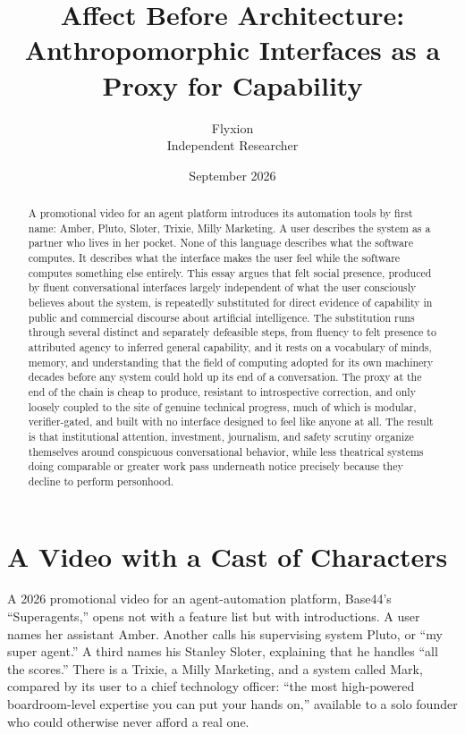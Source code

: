 \documentclass[11pt]{article}
\title{Affect Before Architecture: Anthropomorphic Interfaces as a Proxy for Capability}
\author{Flyxion \\ \small Independent Researcher}
\date{September 2026}
\begin{document}
\maketitle

\begin{abstract}
A promotional video for an agent platform introduces its automation tools by first name: Amber, Pluto, Sloter, Trixie, Milly Marketing. A user describes the system as a partner who lives in her pocket. None of this language describes what the software computes. It describes what the interface makes the user feel while the software computes something else entirely. This essay argues that felt social presence, produced by fluent conversational interfaces largely independent of what the user consciously believes about the system, is repeatedly substituted for direct evidence of capability in public and commercial discourse about artificial intelligence. The substitution runs through several distinct and separately defeasible steps, from fluency to felt presence to attributed agency to inferred general capability, and it rests on a vocabulary of minds, memory, and understanding that the field of computing adopted for its own machinery decades before any system could hold up its end of a conversation. The proxy at the end of the chain is cheap to produce, resistant to introspective correction, and only loosely coupled to the site of genuine technical progress, much of which is modular, verifier-gated, and built with no interface designed to feel like anyone at all. The result is that institutional attention, investment, journalism, and safety scrutiny organize themselves around conspicuous conversational behavior, while less theatrical systems doing comparable or greater work pass underneath notice precisely because they decline to perform personhood.
\end{abstract}

\section{A Video with a Cast of Characters}
\label{sec:video}

A 2026 promotional video for an agent-automation platform, Base44's ``Superagents,''\cite{base44} opens not with a feature list but with introductions. A user names her assistant Amber. Another calls his supervising system Pluto, or ``my super agent.'' A third names his Stanley Sloter, explaining that he handles ``all the scores.'' There is a Trixie, a Milly Marketing, and a system called Mark, compared by its user to a chief technology officer: ``the most high-powered boardroom-level expertise you can put your hands on,'' available to a solo founder who could otherwise never afford a real one.
\end{document}
